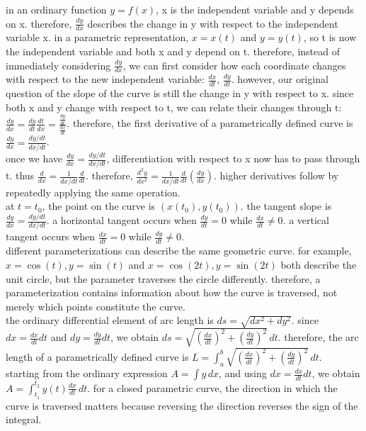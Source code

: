 \documentclass{article}
\begin{document}
in an ordinary function $y = f(x)$, x is the independent variable and y depends on x. therefore, $\frac{dy}{dx}$ describes the change in y with respect to the independent variable x. in a parametric representation, $x = x(t)$ and $y = y(t)$, so t is now the independent variable and both x and y depend on t. therefore, instead of immediately considering $\frac{dy}{dx}$, we can first consider how each coordinate changes with respect to the new independent variable: $\frac{dx}{dt}$, $\frac{dy}{dt}$. however, our original question of the slope of the curve is still the change in y with respect to x. since both x and y change with respect to t, we can relate their changes through t: $\frac{dy}{dx} = \frac{dy}{dt}\frac{dt}{dx} = \frac{\frac{dy}{dt}}{\frac{dx}{dt}}$. therefore, the first derivative of a parametrically defined curve is $\frac{dy}{dx} = \frac{dy/dt}{dx/dt}$.\\

once we have $\frac{dy}{dx} = \frac{dy/dt}{dx/dt}$, differentiation with respect to x now has to pass through t. thus $\frac{d}{dx} = \frac{1}{dx/dt}\frac{d}{dt}$. therefore, $\frac{d^2y}{dx^2} = \frac{1}{dx/dt}\frac{d}{dt}\left(\frac{dy}{dx}\right)$. higher derivatives follow by repeatedly applying the same operation.\\

at $t=t_0$, the point on the curve is $(x(t_0),y(t_0))$. the tangent slope is $\frac{dy}{dx} = \frac{dy/dt}{dx/dt}$. a horizontal tangent occurs when $\frac{dy}{dt}=0$ while $\frac{dx}{dt}\neq0$. a vertical tangent occurs when $\frac{dx}{dt}=0$ while $\frac{dy}{dt}\neq0$.\\

different parameterizations can describe the same geometric curve. for example, $x=\cos(t), y=\sin(t)$ and $x=\cos(2t), y=\sin(2t)$ both describe the unit circle, but the parameter traverses the circle differently. therefore, a parameterization contains information about how the curve is traversed, not merely which points constitute the curve.\\

the ordinary differential element of arc length is $ds=\sqrt{dx^2+dy^2}$. since $dx=\frac{dx}{dt}dt$ and $dy=\frac{dy}{dt}dt$, we obtain $ds=\sqrt{\left(\frac{dx}{dt}\right)^2+\left(\frac{dy}{dt}\right)^2}\,dt$. therefore, the arc length of a parametrically defined curve is $L=\int_a^b\sqrt{\left(\frac{dx}{dt}\right)^2+\left(\frac{dy}{dt}\right)^2}\,dt$.\\

starting from the ordinary expression $A=\int y\,dx$, and using $dx=\frac{dx}{dt}dt$, we obtain $A=\int_{t_1}^{t_2}y(t)\frac{dx}{dt}\,dt$. for a closed parametric curve, the direction in which the curve is traversed matters because reversing the direction reverses the sign of the integral.\\
\end{document}
